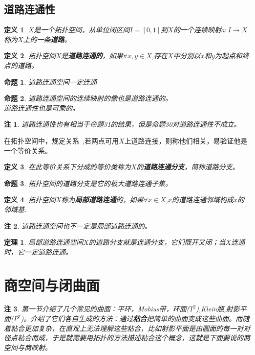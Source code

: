\documentclass[UTF8]{ctexart}
\newtheorem{dfnt}{定义}
\newtheorem{thr}{定理}
\newtheorem*{note}{注}
\newtheorem{pro}{命题}
\begin{document}
\subsection{道路连通性}
\begin{dfnt}
$X$是一个拓扑空间，从单位闭区间$I=[0,1]$到$X$的一个连续映射$a:I\rightarrow X$称为$X$上的一条\textbf{道路}。
\end{dfnt}
\begin{dfnt}
拓扑空间$X$是\textbf{道路连通的}，如果$\forall x,y\in X$,存在$X$中分别以$x$和$y$为起点和终点的道路。
\end{dfnt}
\begin{pro}
道路连通空间一定连通
\end{pro}
\begin{pro}
道路连通空间的连续映射的像也是道路连通的。\\道路连通性也是可乘的。
\end{pro}
\begin{note}
道路连通性也有相当于命题31的结果，但是命题30对道路连通性不成立。
\end{note}
在拓扑空间中，规定关系~,若两点可用$X$上道路连接，则称他们相关，易验证他是一个等价关系。
\begin{dfnt}
在此等价关系下分成的等价类称为$X$的\textbf{道路连通分支}，简称道路分支。
\end{dfnt}
\begin{pro}
拓扑空间的道路分支是它的极大道路连通子集。
\end{pro}
\begin{dfnt}
拓扑空间$X$称为\textbf{局部道路连通}的，如果$\forall x\in X$,$x$的道路连通邻域构成$x$的邻域基.
\end{dfnt}
\begin{note}
道路连通空间也不一定是局部道路连通的。
\end{note}
\begin{thr}
局部道路连通空间$X$的道路分支就是连通分支，它们既开又闭；当$X$连通时，它一定道路连通。
\end{thr}

\section{商空间与闭曲面}
\begin{note}
第一节介绍了几个常见的曲面：平环，Mobius带，环面($T^2$),Klein瓶,射影平面($P^2$)。介绍了它们各自生成的方法：通过\textbf{粘合}把简单的曲面变成这些曲面。而随着粘合更加复杂，在直观上无法理解这些粘合，比如射影平面是由圆面的每一对对径点粘合而成，于是就需要用拓扑的方法描述粘合这个概念，这就是下面要说的商空间与商映射。
\end{note}
\end{document}
